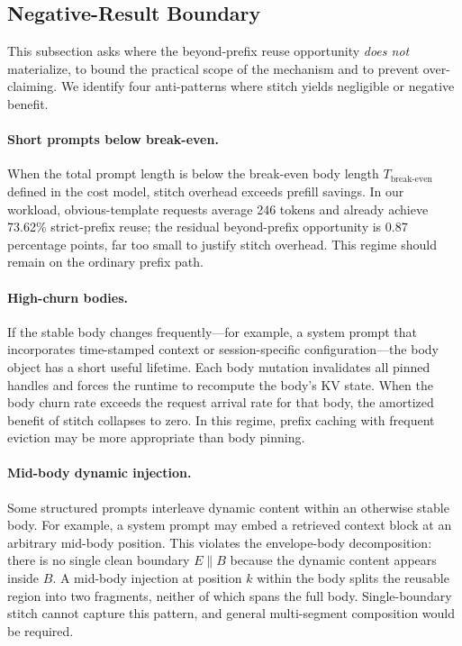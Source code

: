 \documentclass[conference]{IEEEtran}
\begin{document}
\subsection{Negative-Result Boundary}

This subsection asks where the beyond-prefix reuse opportunity \emph{does not} materialize, to bound the practical scope of the mechanism and to prevent over-claiming. We identify four anti-patterns where stitch yields negligible or negative benefit.

\paragraph{Short prompts below break-even.}
When the total prompt length is below the break-even body length $T_{\text{break-even}}$ defined in the cost model, stitch overhead exceeds prefill savings. In our workload, obvious-template requests average 246 tokens and already achieve 73.62\% strict-prefix reuse; the residual beyond-prefix opportunity is 0.87 percentage points, far too small to justify stitch overhead. This regime should remain on the ordinary prefix path.

\paragraph{High-churn bodies.}
If the stable body changes frequently---for example, a system prompt that incorporates time-stamped context or session-specific configuration---the body object has a short useful lifetime. Each body mutation invalidates all pinned handles and forces the runtime to recompute the body's KV state. When the body churn rate exceeds the request arrival rate for that body, the amortized benefit of stitch collapses to zero. In this regime, prefix caching with frequent eviction may be more appropriate than body pinning.

\paragraph{Mid-body dynamic injection.}
Some structured prompts interleave dynamic content within an otherwise stable body. For example, a system prompt may embed a retrieved context block at an arbitrary mid-body position. This violates the envelope-body decomposition: there is no single clean boundary $E \| B$ because the dynamic content appears inside $B$. A mid-body injection at position $k$ within the body splits the reusable region into two fragments, neither of which spans the full body. Single-boundary stitch cannot capture this pattern, and general multi-segment composition would be required.
\end{document}
